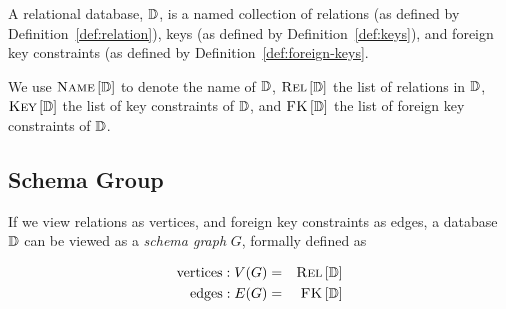 	\begin{defn}
	\label{def:relational-database}
		A relational database, $\mathbb{D}$, is a named collection of relations (as defined by Definition~\ref{def:relation}), keys (as defined by Definition~\ref{def:keys}), and foreign key constraints (as defined by Definition~\ref{def:foreign-keys}.
		
		We use $\textsc{Name}\left[\mathbb{D}\right]$ to denote the name of $\mathbb{D}$, $\textsc{Rel}\left[\mathbb{D}\right]$ the list of relations in $\mathbb{D}$, $\textsc{Key}\left[\mathbb{D}\right]$ the list of key constraints of $\mathbb{D}$, and $\textsc{FK}\left[\mathbb{D}\right]$ the list of foreign key constraints of $\mathbb{D}$.
	\end{defn}
	
	\subsection{Schema Group}
		\begin{defn}
			If we view relations as vertices, and foreign key constraints as edges, a database $\mathbb{D}$ can be viewed as a \emph{schema graph} $G$, formally defined as
			
			\begin{eqnarray*}
				\mathrm{vertices}:  V(G) &=& \textsc{Rel}\left[\mathbb{D}\right] \\
				\mathrm{edges}:  E(G) &=& \textsc{FK}\left[\mathbb{D}\right]
			\end{eqnarray*}
		\end{defn}
		
